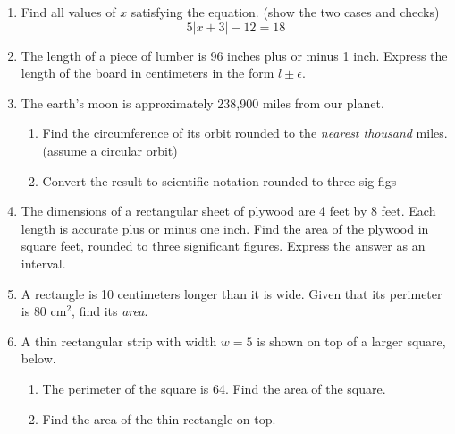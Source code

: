 \begin{enumerate}
\item Find all values of $x$ satisfying the equation. (show the two cases and checks) 
$$ 5|x+3|-12 = 18$$

\newpage
\item The length of a piece of lumber is 96 inches plus or minus 1 inch. Express the length of the board in centimeters in the form $l \pm \epsilon$. \vspace{3cm}

\item The earth's moon is approximately 238,900 miles from our planet. 
\begin{enumerate}
  \item Find the circumference of its orbit rounded to the \emph{nearest thousand} miles. (assume a circular orbit) \vspace{1cm}
  \item Convert the result to scientific notation rounded to three sig figs
\end{enumerate} \vspace{1cm}

\item The dimensions of a rectangular sheet of plywood are 4 feet by 8 feet. Each length is accurate plus or minus one inch. Find the area of the plywood in square feet, rounded to three significant figures. Express the answer as an interval. \vspace{3cm}

\item A rectangle is 10 centimeters longer than it is wide. Given that its perimeter is $80 \text{ cm}^2$, find its \emph{area}. 
  \begin{flushleft}
  \end{flushleft} \vspace{4cm}

\newpage
\item A thin rectangular strip with width $w=5$ is shown on top of a larger square, below.
  \begin{multicols}{2}
    \begin{enumerate}
      \item The perimeter of the square is 64. Find the area of the square. \vspace{2cm}
      \item Find the area of the thin rectangle on top.
      \end{enumerate}
    \end{multicols}
  

\end{enumerate}
